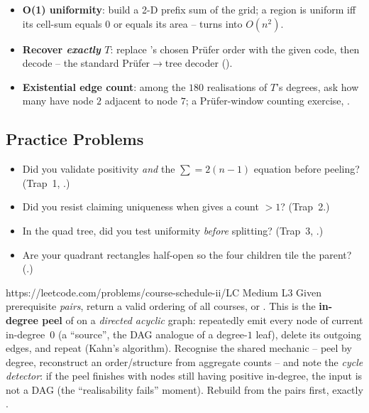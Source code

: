 \begin{hardeningbox}
\begin{itemize}[nosep, leftmargin=1.4em]
  \item \textbf{O(1) uniformity}: build a 2-D prefix sum  of the grid; a region is uniform
        iff its cell-sum equals $0$ or equals its area -- turns  into $O(n^2)$.
  \item \textbf{Recover \emph{exactly} $T$}: replace 's chosen Pr\"ufer order with
        the given code, then decode -- the standard Prüfer$\to$tree decoder ().
  \item \textbf{Existential edge count}: among the $180$ realisations of $T$'s degrees, ask how many
        have node $2$ adjacent to node $7$; a Pr\"ufer-window counting exercise, .
\end{itemize}
\end{hardeningbox}

\subsection{Practice Problems}

\begin{stuckbox}
\begin{itemize}[nosep, leftmargin=1.4em]
  \item Did you validate positivity \emph{and} the $\sum=2(n-1)$ equation before peeling?
        (Trap~1, .)
  \item Did you resist claiming uniqueness when  gives a count $>1$? (Trap~2.)
  \item In the quad tree, did you test uniformity \emph{before} splitting? (Trap~3, .)
  \item Are your quadrant rectangles half-open so the four children tile the parent? (.)
\end{itemize}
\end{stuckbox}

\begin{practiceset}
    {https://leetcode.com/problems/course-schedule-ii/}{LC Medium L3}
    {Given prerequisite \emph{pairs}, return a valid ordering of all courses, or \code{[]}. This is the
    \textbf{in-degree peel} of  on a \emph{directed acyclic} graph: repeatedly emit
    every node of current in-degree~$0$ (a ``source'', the DAG analogue of a degree-$1$ leaf), delete
    its outgoing edges, and repeat (Kahn's algorithm). Recognise the shared mechanic -- peel by degree,
    reconstruct an order/structure from aggregate counts -- and note the \emph{cycle detector}: if the
    peel finishes with nodes still having positive in-degree, the input is not a DAG (the ``realisability
    fails'' moment). Rebuild  from the pairs first, exactly .}
\end{practiceset}

